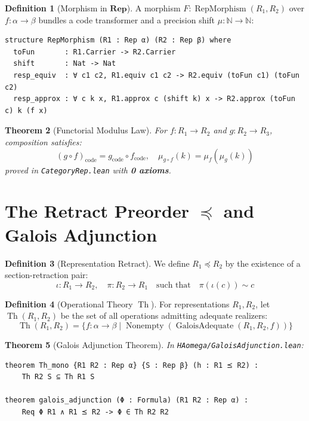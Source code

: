 \documentclass[11pt,a4paper]{article}
\newtheorem{theorem}{Theorem}[section]
\theoremstyle{definition}
\newtheorem{definition}[theorem]{Definition}
\theoremstyle{remark}
\newcommand{\Rep}{\ensuremath{\mathbf{Rep}}}
\newcommand{\N}{\ensuremath{\mathbb{N}}}
\newcommand{\Th}{\ensuremath{\operatorname{Th}}}
\newcommand{\preceqR}{\ensuremath{\preceq}}
\begin{document}
\begin{definition}[Morphism in $\Rep$]
A morphism $F : \operatorname{RepMorphism}(R_1, R_2)$ over $f : \alpha \to \beta$ bundles a code transformer and a precision shift $\mu : \N \to \N$:
\begin{lstlisting}[language=Lean]
structure RepMorphism (R1 : Rep α) (R2 : Rep β) where
  toFun       : R1.Carrier -> R2.Carrier
  shift       : Nat -> Nat
  resp_equiv  : ∀ c1 c2, R1.equiv c1 c2 -> R2.equiv (toFun c1) (toFun c2)
  resp_approx : ∀ c k x, R1.approx c (shift k) x -> R2.approx (toFun c) k (f x)
\end{lstlisting}
\end{definition}

\begin{theorem}[Functorial Modulus Law]
For $f : R_1 \to R_2$ and $g : R_2 \to R_3$, composition satisfies:
\[
(g \circ f)_{\text{code}} = g_{\text{code}} \circ f_{\text{code}}, \quad \mu_{g \circ f}(k) = \mu_f(\mu_g(k))
\]
proved in \texttt{CategoryRep.lean} with \textbf{0 axioms}.
\end{theorem}

\section{The Retract Preorder $\preceq$ and Galois Adjunction}

\begin{definition}[Representation Retract]
We define $R_1 \preceqR R_2$ by the existence of a section-retraction pair:
\[
\iota : R_1 \to R_2, \quad \pi : R_2 \to R_1 \quad \text{such that} \quad \pi(\iota(c)) \sim c
\]
\end{definition}

\begin{definition}[Operational Theory $\Th$]
For representations $R_1, R_2$, let $\Th(R_1, R_2)$ be the set of all operations admitting adequate realizers:
\[
\Th(R_1, R_2) = \{ f : \alpha \to \beta \mid \operatorname{Nonempty}(\operatorname{GaloisAdequate}(R_1, R_2, f)) \}
\]
\end{definition}

\begin{theorem}[Galois Adjunction Theorem]
In \texttt{HAomega/GaloisAdjunction.lean}:
\begin{lstlisting}[language=Lean]
theorem Th_mono {R1 R2 : Rep α} {S : Rep β} (h : R1 ⪯ R2) :
    Th R2 S ⊆ Th R1 S

theorem galois_adjunction (Φ : Formula) (R1 R2 : Rep α) :
    Req Φ R1 ∧ R1 ⪯ R2 -> Φ ∈ Th R2 R2
\end{lstlisting}
\end{theorem}
\end{document}
